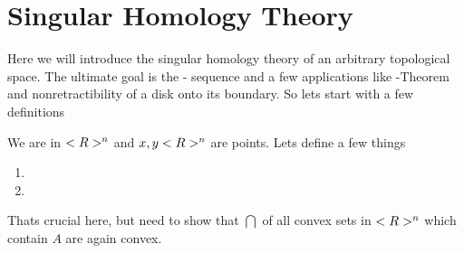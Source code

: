 \section{Singular Homology Theory}
Here we will introduce the singular homology theory of an arbitrary topological space. The ultimate goal is the - sequence and a few applications like -Theorem and nonretractibility of a disk onto its boundary.
So lets start with a few definitions
\begin{definition}
	We are in $<R>^n$ and $x,y <R>^n$ are points. Lets define a few things
	\begin{enumerate}
		\item {}
		\item {}
	\end{enumerate}
\end{definition}
\begin{*remark}
	Thats crucial here, but need to show that $\bigcap$ of all convex sets in $<R>^n$ which contain $A$ are again convex.
\end{*remark}